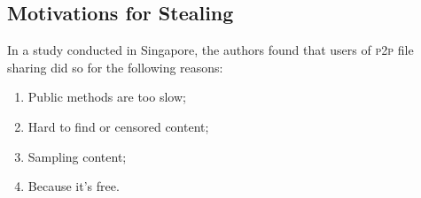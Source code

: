 \subsection{Motivations for Stealing}
In a study conducted in Singapore, the authors found that users of \textsc{p2p}
file sharing did so for the following reasons:\cite{MoreJustFree}
\begin{enumerate}[nosep]
      \item Public methods are too slow;
      \item Hard to find or censored content;
      \item Sampling content;
      \item Because it's free.
\end{enumerate}
